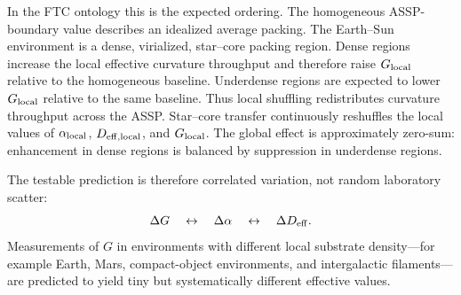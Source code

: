 \documentclass[11pt,a4paper]{article}
\begin{document}
      In the FTC ontology this is the expected ordering. The homogeneous ASSP-boundary value describes an idealized average packing. The Earth--Sun environment is a dense, virialized, star--core packing region. Dense regions increase the local effective curvature throughput and therefore raise \(G_{\rm local}\) relative to the homogeneous baseline. Underdense regions are expected to lower \(G_{\rm local}\) relative to the same baseline. Thus local shuffling redistributes curvature throughput across the ASSP. Star--core transfer continuously reshuffles the local values of \(\alpha_{\rm local}\), \(D_{\rm eff,local}\), and \(G_{\rm local}\). The global effect is approximately zero-sum: enhancement in dense regions is balanced by suppression in underdense regions.

      The testable prediction is therefore correlated variation, not random
      laboratory scatter:
      \[
      \Delta G
      \quad\leftrightarrow\quad
      \Delta\alpha
      \quad\leftrightarrow\quad
      \Delta D_{\rm eff}.
      \]
      Measurements of \(G\) in environments with different local substrate density---for example Earth, Mars, compact-object environments, and intergalactic filaments---are predicted to yield tiny but systematically different effective values.
    
\end{document}
